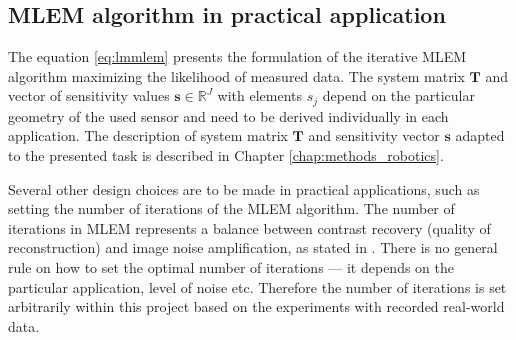 \subsection{MLEM algorithm in practical application}
The equation \ref{eq:lmmlem} presents the formulation of the iterative \ac{MLEM} algorithm maximizing the likelihood of measured data.
The system matrix $\mathbf{T}$ and vector of sensitivity values $\mathbf{s} \in \mathbb{R}^{J}$ with elements $s_{j}$ depend on the particular geometry of the used sensor and need to be derived individually in each application.
The description of system matrix $\mathbf{T}$ and sensitivity vector $\mathbf{s}$ adapted to the presented task is described in Chapter \ref{chap:methods_robotics}. 

Several other design choices are to be made in practical applications, such as setting the number of iterations of the \ac{MLEM} algorithm.
The number of iterations in \ac{MLEM} represents a balance between contrast recovery (quality of reconstruction) and image noise amplification, as stated in \cite{handheld_mlem_reconstruction}.
There is no general rule on how to set the optimal number of iterations --- it depends on the particular application, level of noise etc.
Therefore the number of iterations is set arbitrarily within this project based on the experiments with recorded real-world data.


















